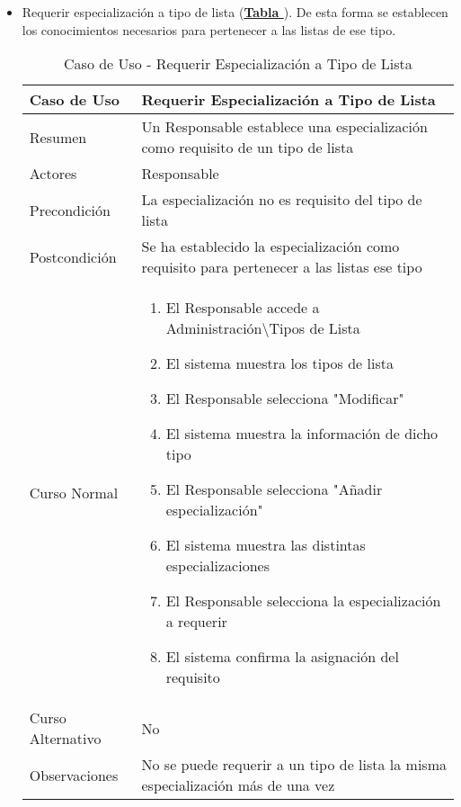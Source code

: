 \begin{itemize}
	\item \addtocounter{tabla}{1} Requerir especialización a tipo de lista (\textbf{\hyperref[tab:curRequerirEspecTipoLst]{Tabla }}). De esta forma se establecen los conocimientos necesarios para pertenecer a las listas de ese tipo.
		\begin{table}[!htbp]
		  \centering  \addtocounter{casouso}{1}
		  \begin{tabular}{|l | p{100mm}|}
		    \textbf{Caso de Uso}  & \textbf{Requerir Especialización a Tipo de Lista} \\ \hline
		    Resumen 		 & Un Responsable establece una especialización como requisito de un tipo de lista \\ \hline
		    Actores  		 & Responsable \\ \hline
		    Precondición  	 & La especialización no es requisito del tipo de lista  \\ \hline
		    Postcondición  	 & Se ha establecido la especialización como requisito para pertenecer a las listas ese tipo \\ \hline
		    Curso Normal   	 & \begin{enumerate}
			  \item El Responsable accede a Administración\textbackslash Tipos de Lista
			  \item El sistema muestra los tipos de lista
			  \item El Responsable selecciona "Modificar"
			  \item El sistema muestra la información de dicho tipo
			  \item El Responsable selecciona "Añadir especialización"
			  \item El sistema muestra las distintas especializaciones
			  \item El Responsable selecciona la especialización a requerir
			  \item El sistema confirma la asignación del requisito
		    \end{enumerate}  \\ \hline
		    Curso Alternativo  & No  \\ \hline
		    Observaciones 	 & No se puede requerir a un tipo de lista la misma especialización más de una vez  \\ \hline
		  \end{tabular}
		  \caption{Caso de Uso  - Requerir Especialización a Tipo de Lista}
		  \label{tab:curRequerirEspecTipoLst}
		\end{table}
		\FloatBarrier
\end{itemize}

